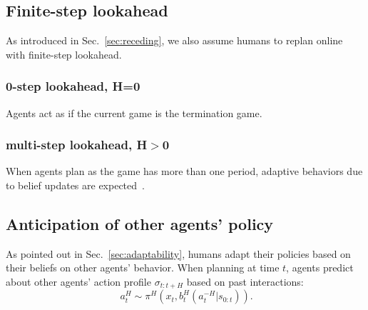 \documentclass[letterpaper, 10 pt, conference]{ieeeconf}  %
\begin{document}
\subsection{Finite-step lookahead}
As introduced in Sec.~\ref{sec:receding}, we also assume humans to replan 
online with finite-step lookahead. 
\subsubsection{0-step lookahead, H=0}
Agents act as if the current game is the termination game. 

\subsubsection{multi-step lookahead, H$>$0}
When agents plan as the game has more than one period, adaptive behaviors due 
to belief updates are expected~\cite{nikolaidis2016formalizing}.




\subsection{Anticipation of other agents' policy}
As pointed out in Sec.~\ref{sec:adaptability}, humans adapt their policies 
based on their beliefs on other agents' behavior.
When planning at time $t$, agents predict about other agents' 
action profile $\sigma_{t:t+H}$ based on past interactions:
\begin{equation}~\label{eq:human_decision1}
a^H_t \sim \pi^H(x_t, b^H_t(a^{-H}_{t}|s_{0:t})).
\end{equation}
\end{document}
